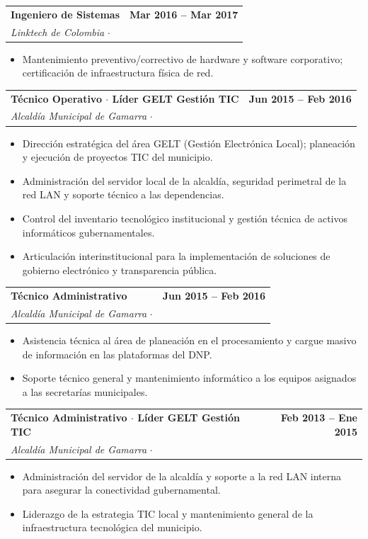 \documentclass[10pt, letterpaper]{article}
\makeatletter
\newcommand{\cventry}[5]{%
  \noindent
  \begin{tabularx}{\linewidth}{@{}X r@{}}
    {\bfseries\color{primary} #1} & {\small\color{medgray}\bfseries #2} \\
    {\small\color{accent}\itshape #3} \quad $\cdot$ \quad {\small\color{darkgray} #4} & \\
  \end{tabularx}
  \vspace{-2pt}
  #5
  \vspace{4pt}
}
\makeatother
\begin{document}
\cventry
  {Ingeniero de Sistemas}
  {Mar 2016 -- Mar 2017}
  {Linktech de Colombia}
  {Bogotá, D.C. -- Presencial}
  {
    \begin{itemize}
      \item Mantenimiento preventivo/correctivo de hardware y software corporativo; certificación de infraestructura física de red.
    \end{itemize}
  }

\cventry
  {Técnico Operativo $\cdot$ Líder GELT Gestión TIC}
  {Jun 2015 -- Feb 2016}
  {Alcaldía Municipal de Gamarra}
  {Gamarra, Cesar -- Presencial}
  {
    \begin{itemize}
      \item Dirección estratégica del área GELT (Gestión Electrónica Local); planeación y ejecución de proyectos TIC del municipio.
      \item Administración del servidor local de la alcaldía, seguridad perimetral de la red LAN y soporte técnico a las dependencias.
      \item Control del inventario tecnológico institucional y gestión técnica de activos informáticos gubernamentales.
      \item Articulación interinstitucional para la implementación de soluciones de gobierno electrónico y transparencia pública.
    \end{itemize}
  }

\cventry
  {Técnico Administrativo}
  {Jun 2015 -- Feb 2016}
  {Alcaldía Municipal de Gamarra}
  {Gamarra, Cesar -- Presencial}
  {
    \begin{itemize}
      \item Asistencia técnica al área de planeación en el procesamiento y cargue masivo de información en las plataformas del DNP.
      \item Soporte técnico general y mantenimiento informático a los equipos asignados a las secretarías municipales.
    \end{itemize}
  }

\cventry
  {Técnico Administrativo $\cdot$ Líder GELT Gestión TIC}
  {Feb 2013 -- Ene 2015}
  {Alcaldía Municipal de Gamarra}
  {Gamarra, Cesar -- Presencial}
  {
    \begin{itemize}
      \item Administración del servidor de la alcaldía y soporte a la red LAN interna para asegurar la conectividad gubernamental.
      \item Liderazgo de la estrategia TIC local y mantenimiento general de la infraestructura tecnológica del municipio.
    \end{itemize}
  }
\end{document}

